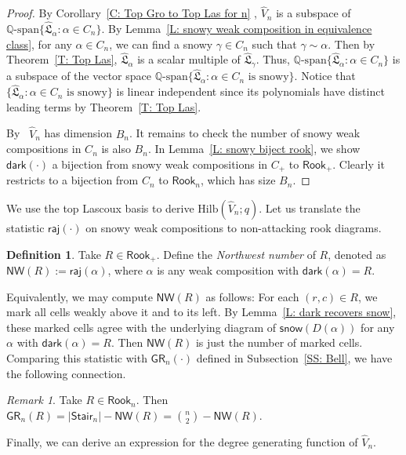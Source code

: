 \documentclass[10pt]{amsart}
\theoremstyle{plain}
\theoremstyle{plain}
\theoremstyle{definition}
\theoremstyle{definition}
\newtheorem{defn}[defn]{Definition}
\theoremstyle{definition}
\theoremstyle{plain}
\theoremstyle{plain}
\theoremstyle{plain}
\theoremstyle{plain}
\theoremstyle{plain}
\theoremstyle{remark}
\newtheorem{rem}[rem]{Remark}
\theoremstyle{remark}
\theoremstyle{plain}
\theoremstyle{plain}
\newcommand{\fL}{\mathfrak{L}}
\newcommand{\topLas}{\widehat{\fL}}
\newcommand{\Q}{\mathbb{Q}}
\newcommand{\dark}{\mathsf{dark}}
\newcommand{\snow}{\mathsf{snow}}
\newcommand{\raj}{\mathsf{raj}}
\newcommand{\Rook}{\mathsf{Rook}}
\newcommand{\Stair}{\mathsf{Stair}}
\newcommand{\GR}{\mathsf{GR}}
\newcommand{\NW}{\mathsf{NW}}
\newcommand{\definition}[1]{{\color{darkred}\emph{#1}}}
\newcommand{\Hilb}{\mathrm{Hilb}}
\begin{document}
\begin{proof}
By Corollary~\ref{C: Top Gro to Top Las for n} ,
$\widehat{V}_n$ is a subspace of 
$\Q\textrm{-span}\{\topLas_\alpha: \alpha \in C_n\}$.
By Lemma~\ref{L: snowy weak composition in equivalence class},
for any $\alpha \in C_n$,
we can find a snowy $\gamma \in C_n$
such that $\gamma \sim \alpha$.
Then by Theorem~\ref{T: Top Las},
$\topLas_\alpha$ is a scalar
multiple of $\topLas_\gamma$.
Thus, 
$\Q\textrm{-span}\{\topLas_\alpha: \alpha \in C_n\}$ is a subspace of the vector space 
$\Q\textrm{-span}\{\topLas_\alpha: \alpha \in C_n \textrm{ is snowy}\}$.
Notice that $\{\topLas_\alpha: \alpha \in C_n \textrm{ is snowy}\}$
is linear independent since its polynomials
have distinct leading terms 
by Theorem~\ref{T: Top Las}.

By~\cite[Theorem~1.4]{PSW}
$\widehat{V}_n$ has dimension $B_n$.
It remains to check the number of snowy weak compositions
in $C_n$ is also $B_n$.
In Lemma~\ref{L: snowy biject rook},
we show $\dark(\cdot)$ a bijection from
snowy weak compositions in $C_+$ to $\Rook_+$.
Clearly it restricts to a bijection from
$C_n$ to $\Rook_n$,
which has size $B_n$.
\end{proof}

We use the top Lascoux basis 
to derive $\Hilb(\widehat{V}_n; q)$. 
Let us translate 
the statistic $\raj(\cdot)$ 
on snowy weak compositions
to non-attacking rook diagrams.

\begin{defn}
Take $R \in \Rook_+$.
Define the \definition{Northwest number} of $R$,
denoted as $\NW(R) := \raj(\alpha)$, 
where $\alpha$ is any weak composition
with $\dark(\alpha) = R$.
\end{defn}

Equivalently, we may compute $\NW(R)$ as follows:
For each $(r,c) \in R$, we mark all cells
weakly above it and to its left.
By Lemma~\ref{L: dark recovers snow},
these marked cells agree with the underlying diagram of $\snow(D(\alpha))$ for any $\alpha$ with $\dark(\alpha) = R$.
Then $\NW(R)$ is just the number of marked cells.
Comparing this statistic with $\GR_n(\cdot)$
defined in Subsection~\ref{SS: Bell},
we have the following connection.

\begin{rem}
\label{R: NW and GR}
Take $R \in \Rook_n$.
Then $\GR_n(R) = |\Stair_n| - \NW(R) = {\binom{n}{2}} - \NW(R)$.
\end{rem}

Finally, we can derive an expression
for the degree generating function of $\widehat{V}_n$.
\end{document}
